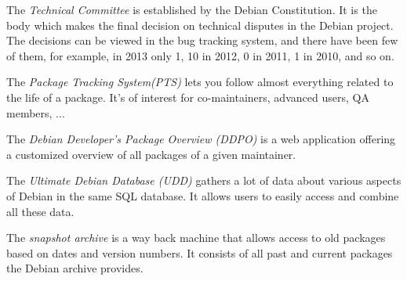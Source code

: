 \documentclass[11pt]{article}
\begin{document}
The \emph{Technical Committee} is established by the Debian Constitution. It is the body which makes the final decision on technical disputes in the Debian project. The decisions can be viewed in the bug tracking system, and there have been few of them, for example, in 2013 only 1, 10 in 2012, 0 in 2011, 1 in 2010, and so on.

The \emph{Package Tracking System(PTS)} lets you follow almost everything related to the life of a package. It's of interest for co-maintainers, advanced users, QA members, ...

The \emph{Debian Developer's Package Overview (DDPO)} is a web application offering a customized overview of all packages of a given maintainer. 

The \emph{Ultimate Debian Database (UDD)} gathers a lot of data about various aspects of Debian in the same SQL database. It allows users to easily access and combine all these data.

The \emph{snapshot archive }is a way back machine that allows access to old packages based on dates and version numbers. It consists of all past and current packages the Debian archive provides. 

\newpage




 \nocite{*}
\end{document}
